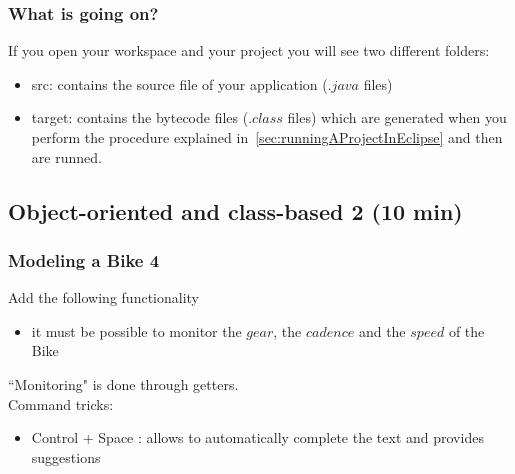 \documentclass{article}
\theoremstyle{definition}
\begin{document}
\subsubsection{What is going on?}
If you open your workspace and your project you will see two different folders:
\begin{itemize}
\item src: contains the source file of your application ($.java$ files)
\item target: contains the bytecode files ($.class$ files) which are generated when you perform the procedure explained in~\ref{sec:runningAProjectInEclipse} and then are runned.
\end{itemize}

\subsection{Object-oriented and class-based 2 (10 min)}

\subsubsection{Modeling a Bike 4}
Add the following functionality
\begin{itemize}
\item it must be possible to monitor the $gear$, the $cadence$ and the $speed$ of the Bike
\end{itemize}

``Monitoring" is done through getters.\\
Command tricks:
\begin{itemize}
\item Control + Space : allows to automatically complete the text and provides suggestions
\end{itemize}
\end{document}
